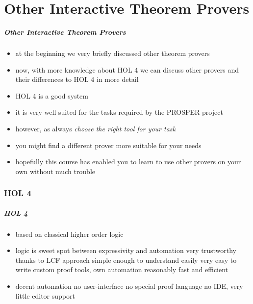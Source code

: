 \part{Other Interactive Theorem Provers}

\frame[plain]{\partpage}

\begin{frame}
\frametitle{Other Interactive Theorem Provers}

\begin{itemize}
\item at the beginning we very briefly discussed other theorem provers
\item now, with more knowledge about HOL 4 we can discuss other provers and their differences to HOL 4 in more detail
\item HOL 4 is a good system
\item it is very well suited for the tasks required by the PROSPER project
\item however, as always \emph{choose the right tool for your task}
\item you might find a different prover more suitable for your needs
\item hopefully this course has enabled you to learn to use other provers on your own without much trouble
\end{itemize}
\end{frame}


\section{HOL 4}
\begin{frame}
\frametitle{HOL 4}

\begin{itemize}
\item based on classical higher order logic
\item logic is sweet spot between expressivity and automation
\pro very trustworthy thanks to LCF approach
\pro simple enough to understand easily
\pro very easy to write custom proof tools, \ie own automation
\pro reasonably fast and efficient
\item decent automation
\con no user-interface
\con no special proof language
\con no IDE, very little editor support
\end{itemize}
\end{frame}


